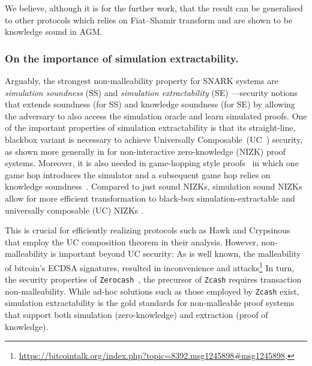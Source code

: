 \documentclass[runningheads,10pt]{llncs}
\begin{document}
	We believe, although it is for the further work, that the result can be generalised to other protocols which relies on Fiat--Shamir transform and are shown to be knowledge sound in AGM.
	
	\subsubsection*{On the importance of simulation extractability.}
	Arguably, the strongest non-malleability property for SNARK systems are
  \emph{simulation soundness} (SS) and \emph{simulation extractability} (SE)
  \cite{FOCS:Sahai99,C:DDOPS01}---security notions that extends soundness (for
  SS) and knowledge soundness (for SE) by allowing the adversary to also access the simulation oracle and learn simulated proofs. 
	One of the important properties of simulation extractability is that its
	straight-line, blackbox variant is necessary to achieve Universally Composable~(UC~\cite{FOCS:Canetti01}) security, as shown more generally in 	\cite{STOC:CLOS02,AC:Groth06,EC:GroOstSah06} for non-interactive zero-knowledge (NIZK) proof systems. Moreover, it is also needed in game-hopping style proofs~\cite{EPRINT:Shoup04} in which one game hop
	introduces the simulator and a subsequent game hop relies on knowledge
	soundness~\cite{SP:KMSWP16,CCS:CamDriDub17}.
	Compared to just sound NIZKs, simulation sound NIZKs allow for more efficient transformation to black-box simulation-extractable and universally composable (UC) NIZKs \cite{AFRICACRYPT:Baghery19}. 

  This is crucial for efficiently realizing protocols such as Hawk and
  Crypsinous that employ the UC composition theorem in their analysis. However,
  non-malleability is important beyond UC security: As is well known, the
  malleability of bitcoin's ECDSA signatures, resulted in inconvenience and
  attacks\footnote{\url{https://bitcointalk.org/index.php?topic=8392.msg1245898\#msg1245898}.}
  In turn, the security properties of \texttt{Zerocash}~\cite{SP:BCGGMT14}, the precursor of
  \texttt{Zcash} requires transaction non-malleability. While ad-hoc solutions
  such as those employed by \texttt{Zcash} exist, simulation
  extractability is the gold standards for non-malleable proof systems that support both
  simulation (zero-knowledge) and extraction (proof of knowledge).

	

	
\end{document}
